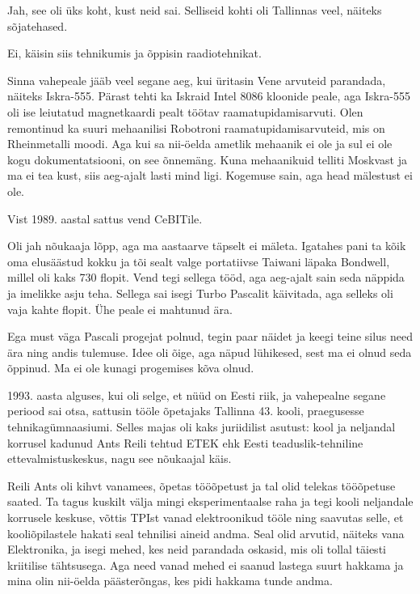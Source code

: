 Jah, see oli üks koht, kust neid sai. Selliseid kohti oli Tallinnas veel, 
näiteks sõjatehased. 


Ei, käisin siis tehnikumis ja õppisin raadiotehnikat. 


Sinna vahepeale jääb veel segane aeg, kui üritasin 
Vene arvuteid parandada, näiteks Iskra-555. Pärast 
tehti ka Iskraid Intel 8086 kloonide peale, aga Iskra-555 oli ise 
leiutatud magnetkaardi pealt töötav raamatupidamisarvuti. Olen remontinud 
ka suuri mehaanilisi Robotroni raamatupidamisarvuteid, mis on 
Rheinmetalli moodi. Aga kui sa nii-öelda ametlik mehaanik ei ole ja 
sul ei ole kogu dokumentatsiooni, on see õnnemäng. Kuna mehaanikuid telliti 
Moskvast ja ma ei tea kust, siis aeg-ajalt lasti mind ligi. Kogemuse sain, aga 
head mälestust ei ole. 

Vist 1989. aastal sattus vend CeBITile. 


Oli jah nõukaaja lõpp, aga ma aastaarve täpselt ei mäleta. Igatahes pani ta kõik oma elusäästud kokku 
ja tõi sealt valge portatiivse Taiwani läpaka Bondwell, millel oli kaks 730 flopit. Vend tegi sellega tööd, aga aeg-ajalt sain seda näppida ja imelikke asju teha. Sellega sai isegi Turbo 
Pascalit käivitada, aga selleks oli vaja 
kahte flopit. Ühe peale ei mahtunud ära. 

Ega must väga Pascali progejat polnud, tegin paar näidet 
ja keegi teine silus need ära ning andis tulemuse. Idee oli 
õige, aga näpud lühikesed, sest ma ei olnud seda õppinud. Ma ei ole kunagi
progemises kõva olnud.

1993. aasta alguses, kui oli selge, et nüüd on Eesti riik, ja vahepealne segane periood sai otsa, sattusin tööle 
õpetajaks Tallinna 
43. kooli, praegusesse 
tehnikagümnaasiumi\label{sisu:43kool}. 
Selles majas oli kaks juriidilist asutust: kool ja 
neljandal korrusel kadunud Ants Reili 
tehtud ETEK ehk Eesti teaduslik-tehniline 
ettevalmistuskeskus, nagu see nõukaajal käis. 

Reili Ants oli 
kihvt vanamees, õpetas tööõpetust ja tal olid telekas 
tööõpetuse saated. Ta tagus kuskilt välja mingi eksperimentaalse raha 
ja tegi kooli neljandale korrusele keskuse, võttis TPIst vanad elektroonikud tööle ning saavutas selle, et 
kooliõpilastele hakati seal tehnilisi aineid andma. Seal olid arvutid, näiteks vana 
Elektronika, ja isegi mehed, kes neid parandada oskasid, mis oli tollal 
täiesti kriitilise tähtsusega. Aga need vanad mehed ei saanud lastega suurt hakkama ja 
mina olin nii-öelda päästerõngas, kes pidi hakkama tunde andma. 


